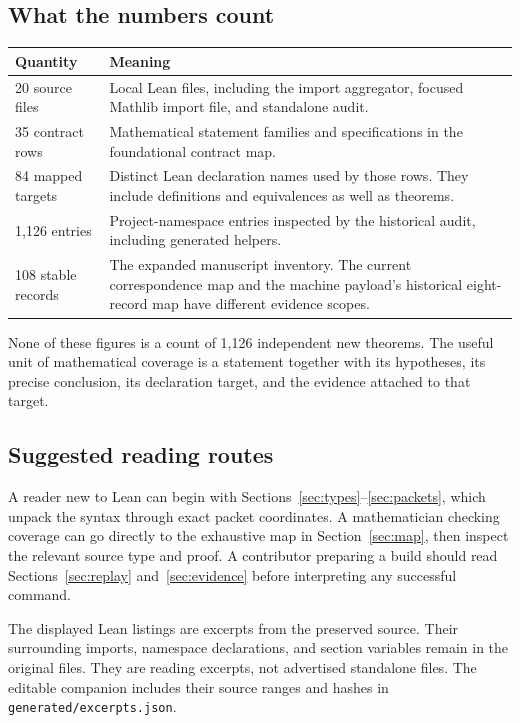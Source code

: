 \documentclass[11pt,a4paper]{article}
\newcommand{\code}[1]{\nolinkurl{#1}}
\begin{document}
\subsection{What the numbers count}

\begin{tabular}{p{}p{}}
\toprule Quantity & Meaning \\\midrule
20 source files & Local Lean files, including the import aggregator, focused Mathlib import file, and standalone audit. \\
35 contract rows & Mathematical statement families and specifications in the foundational contract map. \\
84 mapped targets & Distinct Lean declaration names used by those rows. They include definitions and equivalences as well as theorems. \\
1,126 entries & Project-namespace entries inspected by the historical audit, including generated helpers. \\
108 stable records & The expanded manuscript inventory. The current correspondence map and the machine payload's historical eight-record map have different evidence scopes. \\
\bottomrule
\end{tabular}

None of these figures is a count of 1,126 independent new theorems. The useful unit of mathematical coverage is a statement together with its hypotheses, its precise conclusion, its declaration target, and the evidence attached to that target.

\subsection{Suggested reading routes}

A reader new to Lean can begin with Sections~\ref{sec:types}--\ref{sec:packets}, which unpack the syntax through exact packet coordinates. A mathematician checking coverage can go directly to the exhaustive map in Section~\ref{sec:map}, then inspect the relevant source type and proof. A contributor preparing a build should read Sections~\ref{sec:replay} and~\ref{sec:evidence} before interpreting any successful command.

The displayed Lean listings are excerpts from the preserved source. Their surrounding imports, namespace declarations, and section variables remain in the original files. They are reading excerpts, not advertised standalone files. The editable companion includes their source ranges and hashes in \code{generated/excerpts.json}.
\end{document}
